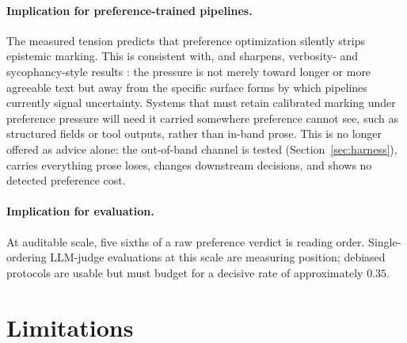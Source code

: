 \documentclass[11pt]{article}
\begin{document}
\paragraph{Implication for preference-trained pipelines.} The measured
tension predicts that preference optimization silently strips epistemic
marking. This is consistent with, and sharpens, verbosity- and
sycophancy-style results \cite{singhal2023length,sharma2023sycophancy}:
the pressure is not merely toward longer or more agreeable text but
away from the specific surface forms by which pipelines currently
signal uncertainty. Systems that must retain calibrated marking under
preference pressure will need it carried somewhere preference cannot
see, such as structured fields or tool outputs, rather than in-band
prose. This is no longer offered as advice alone: the out-of-band
channel is tested (Section~\ref{sec:harness}), carries everything prose
loses, changes downstream decisions, and shows no detected preference
cost.

\paragraph{Implication for evaluation.} At auditable scale, five sixths
of a raw preference verdict is reading order. Single-ordering LLM-judge
evaluations at this scale are measuring position; debiased protocols
are usable but must budget for a decisive rate of approximately
$0.35$.

\section{Limitations}
\label{sec:limits}
\end{document}
